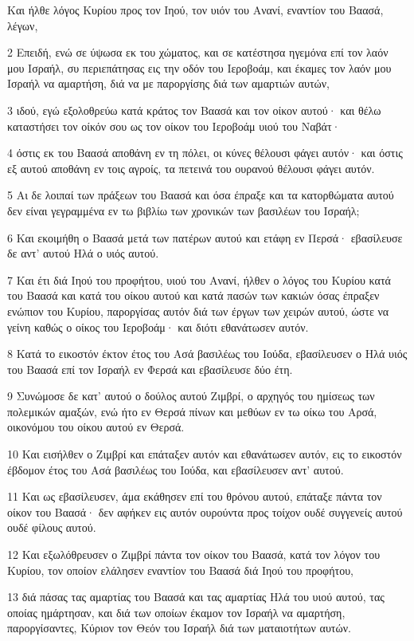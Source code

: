 \par Και ήλθε λόγος Κυρίου προς τον Ιηού, τον υιόν του Ανανί, εναντίον του Βαασά, λέγων,
\par 2 Επειδή, ενώ σε ύψωσα εκ του χώματος, και σε κατέστησα ηγεμόνα επί τον λαόν μου Ισραήλ, συ περιεπάτησας εις την οδόν του Ιεροβοάμ, και έκαμες τον λαόν μου Ισραήλ να αμαρτήση, διά να με παροργίσης διά των αμαρτιών αυτών,
\par 3 ιδού, εγώ εξολοθρεύω κατά κράτος τον Βαασά και τον οίκον αυτού· και θέλω καταστήσει τον οίκόν σου ως τον οίκον του Ιεροβοάμ υιού του Ναβάτ·
\par 4 όστις εκ του Βαασά αποθάνη εν τη πόλει, οι κύνες θέλουσι φάγει αυτόν· και όστις εξ αυτού αποθάνη εν τοις αγροίς, τα πετεινά του ουρανού θέλουσι φάγει αυτόν.
\par 5 Αι δε λοιπαί των πράξεων του Βαασά και όσα έπραξε και τα κατορθώματα αυτού δεν είναι γεγραμμένα εν τω βιβλίω των χρονικών των βασιλέων του Ισραήλ;
\par 6 Και εκοιμήθη ο Βαασά μετά των πατέρων αυτού και ετάφη εν Περσά· εβασίλευσε δε αντ' αυτού Ηλά ο υιός αυτού.
\par 7 Και έτι διά Ιηού του προφήτου, υιού του Ανανί, ήλθεν ο λόγος του Κυρίου κατά του Βαασά και κατά του οίκου αυτού και κατά πασών των κακιών όσας έπραξεν ενώπιον του Κυρίου, παροργίσας αυτόν διά των έργων των χειρών αυτού, ώστε να γείνη καθώς ο οίκος του Ιεροβοάμ· και διότι εθανάτωσεν αυτόν.
\par 8 Κατά το εικοστόν έκτον έτος του Ασά βασιλέως του Ιούδα, εβασίλευσεν ο Ηλά υιός του Βαασά επί τον Ισραήλ εν Φερσά και εβασίλευσε δύο έτη.
\par 9 Συνώμοσε δε κατ' αυτού ο δούλος αυτού Ζιμβρί, ο αρχηγός του ημίσεως των πολεμικών αμαξών, ενώ ήτο εν Θερσά πίνων και μεθύων εν τω οίκω του Αρσά, οικονόμου του οίκου αυτού εν Θερσά.
\par 10 Και εισήλθεν ο Ζιμβρί και επάταξεν αυτόν και εθανάτωσεν αυτόν, εις το εικοστόν έβδομον έτος του Ασά βασιλέως του Ιούδα, και εβασίλευσεν αντ' αυτού.
\par 11 Και ως εβασίλευσεν, άμα εκάθησεν επί του θρόνου αυτού, επάταξε πάντα τον οίκον του Βαασά· δεν αφήκεν εις αυτόν ουρούντα προς τοίχον ουδέ συγγενείς αυτού ουδέ φίλους αυτού.
\par 12 Και εξωλόθρευσεν ο Ζιμβρί πάντα τον οίκον του Βαασά, κατά τον λόγον του Κυρίου, τον οποίον ελάλησεν εναντίον του Βαασά διά Ιηού του προφήτου,
\par 13 διά πάσας τας αμαρτίας του Βαασά και τας αμαρτίας Ηλά του υιού αυτού, τας οποίας ημάρτησαν, και διά των οποίων έκαμον τον Ισραήλ να αμαρτήση, παροργίσαντες, Κύριον τον Θεόν του Ισραήλ διά των ματαιοτήτων αυτών.
